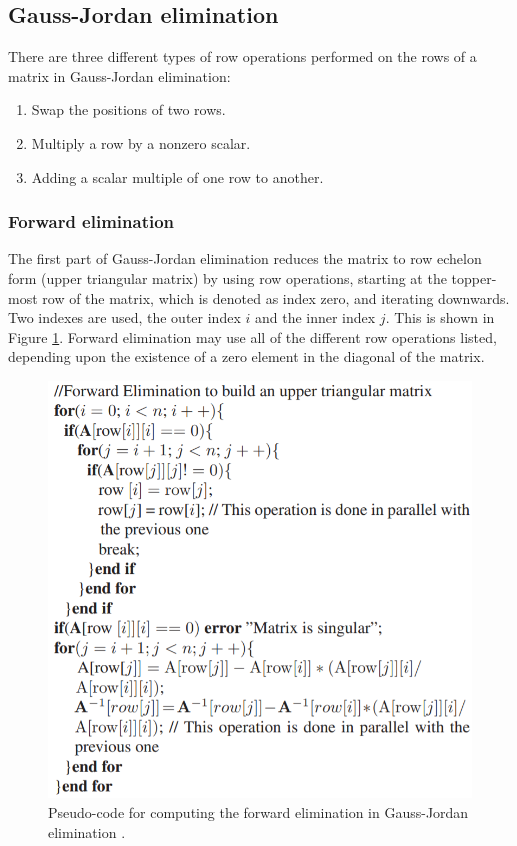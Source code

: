 \subsection{Gauss-Jordan elimination}
\label{sec:gauss_jordan_theory}
There are three different types of row operations performed on the rows of a matrix in Gauss-Jordan elimination:
\begin{enumerate}
\item Swap the positions of two rows. 
\item Multiply a row by a nonzero scalar. 
\item Adding a scalar multiple of one row to another.
\end{enumerate}  

\subsubsection{Forward elimination}
The first part of Gauss-Jordan elimination reduces the matrix to row echelon form (upper triangular matrix) by using row operations, starting at the topper-most row of the matrix, which is denoted as index zero, and iterating downwards. Two indexes are used, the outer index $i$ and the inner index $j$. This is shown in Figure \ref{fig:forward_elimination_pseudocode}. Forward elimination may use all of the different row operations listed, depending upon the existence of a zero element in the diagonal of the matrix.   

\begin{figure}[H]
\centering
   \includegraphics[scale=0.5]{images/forward_elimination_pseudocode.PNG}
  \caption{ Pseudo-code for computing the forward elimination in Gauss-Jordan elimination \cite{gauss_jordan_fpga}. } 
  \label{fig:forward_elimination_pseudocode}
\end{figure}


